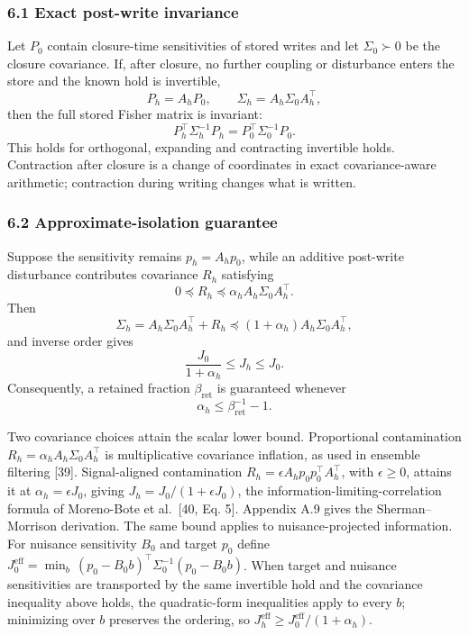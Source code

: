 \documentclass[
  10pt,
]{article}
\begin{document}
\subsubsection{6.1 Exact post-write
invariance}\label{exact-post-write-invariance}

Let \(P_0\) contain closure-time sensitivities of stored writes and let
\(\Sigma_0\succ0\) be the closure covariance. If, after closure, no
further coupling or disturbance enters the store and the known hold is
invertible, \[
P_h=A_hP_0,\qquad \Sigma_h=A_h\Sigma_0A_h^\top,
\] then the full stored Fisher matrix is invariant: \[
\boxed{
P_h^\top\Sigma_h^{-1}P_h=P_0^\top\Sigma_0^{-1}P_0.
}
\] This holds for orthogonal, expanding and contracting invertible
holds. Contraction after closure is a change of coordinates in exact
covariance-aware arithmetic; contraction during writing changes what is
written.

\subsubsection{6.2 Approximate-isolation
guarantee}\label{approximate-isolation-guarantee}

Suppose the sensitivity remains \(p_h=A_hp_0\), while an additive
post-write disturbance contributes covariance \(R_h\) satisfying \[
0\preceq R_h\preceq \alpha_h A_h\Sigma_0A_h^\top.
\] Then \[
\Sigma_h=A_h\Sigma_0A_h^\top+R_h
\preceq
(1+\alpha_h)A_h\Sigma_0A_h^\top,
\] and inverse order gives \[
\boxed{
\frac{J_0}{1+\alpha_h}\le J_h\le J_0.
}
\] Consequently, a retained fraction \(\beta_{\mathrm{ret}}\) is
guaranteed whenever \[
\alpha_h\le\beta_{\mathrm{ret}}^{-1}-1.
\]

Two covariance choices attain the scalar lower bound. Proportional
contamination \(R_h=\alpha_h A_h\Sigma_0A_h^\top\) is multiplicative
covariance inflation, as used in ensemble filtering {[}39{]}.
Signal-aligned contamination \(R_h=\epsilon A_hp_0p_0^\top A_h^\top\),
with \(\epsilon\ge0\), attains it at \(\alpha_h=\epsilon J_0\), giving
\(J_h=J_0/(1+\epsilon J_0)\), the information-limiting-correlation
formula of Moreno-Bote et al.~{[}40, Eq. 5{]}. Appendix A.9 gives the
Sherman--Morrison derivation. The same bound applies to
nuisance-projected information. For nuisance sensitivity \(B_0\) and
target \(p_0\) define
\(J^{\text{eff}}_0=\min_b\,(p_0-B_0b)^\top\Sigma_0^{-1}(p_0-B_0b)\).
When target and nuisance sensitivities are transported by the same
invertible hold and the covariance inequality above holds, the
quadratic-form inequalities apply to every \(b\); minimizing over \(b\)
preserves the ordering, so
\(J^{\text{eff}}_h\ge J^{\text{eff}}_0/(1+\alpha_h)\).
\end{document}
